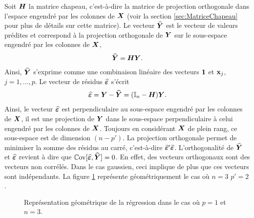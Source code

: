Soit $\bm{H}$ la matrice chapeau, c'est-à-dire la matrice de projection orthogonale dans l'espace engendré par les colonnes de $\bm{X}$ (voir la section \ref{sec:MatriceChapeau} pour plus de détails sur cette matrice). 
Le vecteur $\widehat{\bm{Y}}$ est le vecteur de valeurs prédites et correspond à la projection orthogonale de $\bm{Y}$ sur le sous-espace engendré par les colonnes de $\bm{X}$,
\begin{align*}
    \widehat{\bm{Y}} = \bm{H} \bm{Y}.    
\end{align*}
Ainsi, $\widehat{\bm{Y}}$ s'exprime comme une combinaison linéaire des vecteurs $\bf 1$ et $\bold x_j$, $j=1, \dots, p$.
Le vecteur de résidus $\widehat{\bm\varepsilon}$ s'écrit 
$$\widehat{\bm\varepsilon} = \bm{Y}-\widehat{\bm{Y}} = (\bm{\mathbb{I}}_n-\bm{H})\bm{Y}.$$ 
Ainsi, le vecteur $\widehat{\bm\varepsilon}$ est perpendiculaire au sous-espace engendré par les colonnes de $\bm{X}$, il est une projection de $\bm{Y}$ dans le sous-espace perpendiculaire à celui engendré par les colonnes de $\bm{X}$. Toujours en considérant $\bm{X}$ de plein rang, ce sous-espace est de dimension $(n-p')$. La projection orthogonale permet de minimiser la somme des résidus au carré, c'est-à-dire $\widehat{\bm\varepsilon}'\widehat{\bm\varepsilon}$. L'orthogonalité de $\widehat{\bm{Y}}$ et $\widehat{\bm\varepsilon}$ revient à dire que $\mathbb{C}\text{ov}[\widehat{\bm\varepsilon}, \widehat{\bm{Y}}] = 0$. En effet, des vecteurs orthogonaux sont des vecteurs non corrélés. Dans le cas gaussien, ceci implique de plus que ces vecteurs sont indépendants.
La figure \ref{fig:geometrie} représente géométriquement le cas où $n=3$ $p'=2$. 



\begin{figure}
    \centering
    \caption{Représentation géométrique de la régression dans le cas où $p=1$ et $n=3$.}
    \label{fig:geometrie}
\end{figure}


